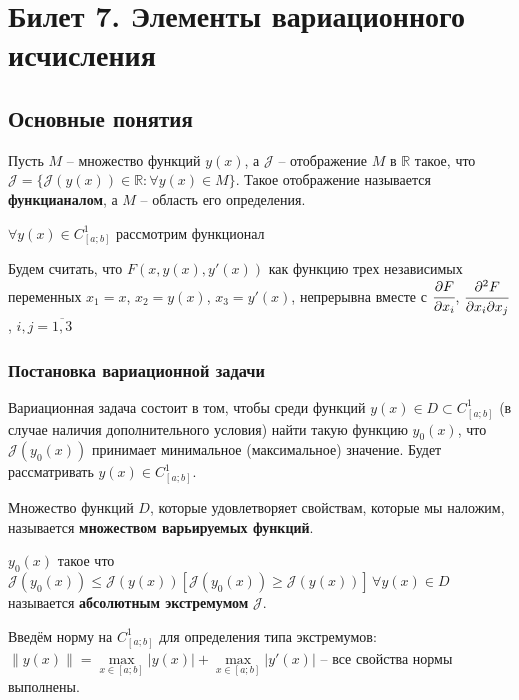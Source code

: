 
\section{Билет 7. Элементы вариационного исчисления}
\subsection{Основные понятия}
\begin{definition}
    Пусть $M$ -- множество функций $y(x)$, а $\mathcal{J}$ -- отображение $M$ в $\mathbb{R}$ такое, что $\mathcal{J} = \{ \mathcal{J}(y(x)) \in \mathbb{R}: \forall y(x) \in M \}$. 
    Такое отображение называется \textbf{функцианалом}, а $M$ -- область его определения. 
\end{definition}

$\forall y(x) \in C^1_{[a;b]}$ рассмотрим функционал 

Будем считать, что $F(x, y(x), y'(x))$ как функцию трех независимых переменных $x_1 = x$, $x_2 = y(x)$, $x_3 = y'(x)$, непрерывна вместе с $\cfrac{\partial{F}}{\partial{x_i}}$,  $\cfrac{\partial^2{F}}{\partial{x_i}\partial{x_j}}$, $i,j = \overline{1, 3}$ 

\subsubsection*{Постановка вариационной задачи}

Вариационная задача состоит в том, чтобы среди функций $y(x) \in D \subset C^1_{[a;b]}$ (в случае наличия дополнительного условия) найти такую функцию $y_0(x)$, что $\mathcal{J}(y_0(x))$ принимает минимальное (максимальное) значение. Будет рассматривать $y(x) \in C^1_{[a;b]}$.

\begin{definition}
    Множество функций $D$, которые удовлетворяет свойствам, которые мы наложим, называется \textbf{множеством варьируемых функций}.
\end{definition}

\begin{definition}
    $y_0(x)$ такое что $\mathcal{J}(y_0(x)) \leq \mathcal{J}(y(x)) [\mathcal{J}(y_0(x)) \geq \mathcal{J}(y(x))] \, \forall y(x) \in D$ называется \textbf{абсолютным экстремумом} $\mathcal{J}$.  
\end{definition}

Введём норму на $C^1_{[a;b]}$ для определения типа экстремумов: $\| y(x) \| = \max \limits_{x \in [a;b]} |y(x)| + \max \limits_{x \in [a;b]} |y'(x)|$ -- все свойства нормы выполнены.

